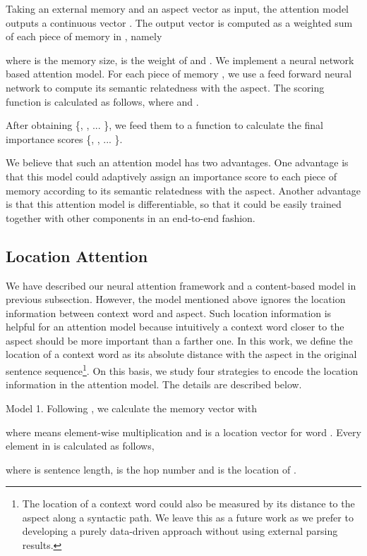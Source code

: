 \documentclass[11pt,letterpaper]{article}
\begin{document}
Taking an external memory  and an aspect vector  as input, the attention model outputs a continuous vector .
The output vector is computed as a weighted sum of each piece of memory in , namely 

where  is the memory size,  is the weight of  and .
We implement a neural network based attention model.
For each piece of memory , we use a feed forward neural network to compute its semantic relatedness with the aspect. The scoring function is calculated as follows, where  and .

After obtaining \{, , ... \}, we feed them to a  function to calculate the final importance scores \{, , ... \}.


We believe that such an attention model has two advantages. 
One advantage is that this model could adaptively assign an importance score to each piece of memory  according to its semantic relatedness with the aspect.
Another advantage is that this attention model is differentiable, so that it could be easily trained together with other components in an end-to-end fashion. 

\subsection{Location Attention}\label{section:location-attention}
We have described our neural attention framework and a content-based model in previous subsection. 
However, the model mentioned above 
ignores the location information between context word and aspect. 
Such location information is helpful for an attention model because intuitively a context word closer to the aspect should be more important than a farther one.
In this work, we define the location of a context word as its absolute distance with the aspect in the original sentence sequence\footnote{The location of a context word could also be measured by its distance to the aspect along a syntactic path. We leave this as a future work as we prefer to developing a purely data-driven approach without using external parsing results.}.
On this basis, we study four strategies to encode the location information in the attention model.
The details are described below.


 {Model 1}. Following , we calculate the memory vector  with 

where  means element-wise multiplication and  is a location vector for word . 
Every element in  is calculated as follows,

where  is sentence length,   is the hop number and  is the location of . 
\end{document}

